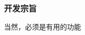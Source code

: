 \begin{frame}
    \frametitle{开发宗旨}

    \vfill
    \begin{center}
        \begin{LARGE}
        \end{LARGE}

        \hspace*{\fill}

        当然，必须是有用的功能
    \end{center}
    \vfill
\end{frame}